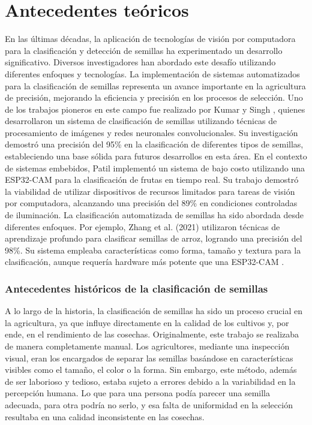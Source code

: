 \section{Antecedentes teóricos}

En las últimas décadas, la aplicación de tecnologías de visión por computadora para la clasificación y detección de semillas ha experimentado un desarrollo significativo. Diversos investigadores han abordado este desafío utilizando diferentes enfoques y tecnologías. La implementación de sistemas automatizados para la clasificación de semillas representa un avance importante en la agricultura de precisión, mejorando la eficiencia y precisión en los procesos de selección. Uno de los trabajos pioneros en este campo fue realizado por Kumar y Singh \cite{qiu2018variety}, quienes desarrollaron un sistema de clasificación de semillas utilizando técnicas de procesamiento de imágenes y redes neuronales convolucionales. Su investigación demostró una precisión del 95\% en la clasificación de diferentes tipos de semillas, estableciendo una base sólida para futuros desarrollos en esta área. En el contexto de sistemas embebidos, Patil \cite{patil2020realtime} implementó un sistema de bajo costo utilizando una ESP32-CAM para la clasificación de frutas en tiempo real. Su trabajo demostró la viabilidad de utilizar dispositivos de recursos limitados para tareas de visión por computadora, alcanzando una precisión del 89\% en condiciones controladas de iluminación. La clasificación automatizada de semillas ha sido abordada desde diferentes enfoques. Por ejemplo, Zhang et al. (2021) utilizaron técnicas de aprendizaje profundo para clasificar semillas de arroz, logrando una precisión del 98\%. Su sistema empleaba características como forma, tamaño y textura para la clasificación, aunque requería hardware más potente que una ESP32-CAM \cite{jin2022identification}. 

\subsubsection{Antecedentes históricos de la clasificación de semillas}
A lo largo de la historia, la clasificación de semillas ha sido un proceso crucial en la agricultura, ya que influye directamente en la calidad de los cultivos y, por ende, en el rendimiento de las cosechas. Originalmente, este trabajo se realizaba de manera completamente manual. Los agricultores, mediante una inspección visual, eran los encargados de separar las semillas basándose en características visibles como el tamaño, el color o la forma. Sin embargo, este método, además de ser laborioso y tedioso, estaba sujeto a errores debido a la variabilidad en la percepción humana. Lo que para una persona podía parecer una semilla adecuada, para otra podría no serlo, y esa falta de uniformidad en la selección resultaba en una calidad inconsistente en las cosechas.

